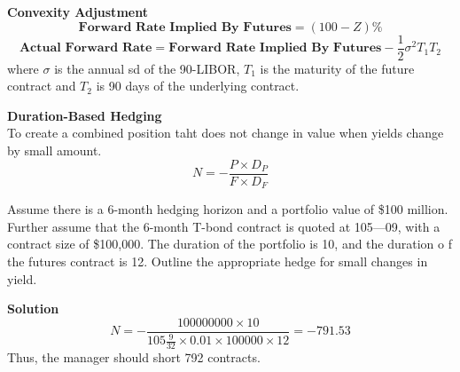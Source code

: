 \documentclass[11pt,fleqn]{book} %
\numberwithin{equation}{section} %
\numberwithin{figure}{section} %
\numberwithin{table}{section} %
\begin{document}
\begin{theorem}\textbf{Convexity Adjustment}\\
$$
\textbf{Forward Rate Implied By Futures}=(100-Z)\%
$$
$$
\textbf{Actual Forward Rate}=\textbf{Forward Rate Implied By Futures}-\frac{1}{2}\sigma^2T_1T_2
$$
where $\sigma$ is the annual sd of the 90-LIBOR, $T_1$ is the maturity of the future contract and $T_2$ is 90 days of the underlying contract.
\end{theorem}
\begin{theorem}\textbf{Duration-Based Hedging}\\
To create a combined position taht does not change in value when yields change by small amount.
$$
N=-\frac{P\times D_P}{F\times D_F}
$$
\end{theorem}
\begin{exercise}
Assume there is a 6-month hedging horizon and a portfolio value of \$100 million. Further
assume that the 6-month T-bond contract is quoted at 105—09, with a contract size of
\$100,000. The duration of the portfolio is 10, and the duration o f the futures contract is
12. Outline the appropriate hedge for small changes in yield.

\textbf{Solution}
$$
N=-\frac{100000000\times 10}{105\frac{9}{32}\times 0.01\times 100000\times 12}=-791.53
$$
Thus, the manager should short 792 contracts.
\end{exercise}

\end{document}
